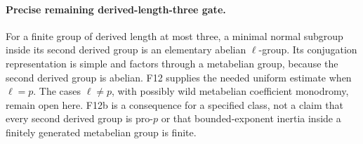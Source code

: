 \paragraph{Precise remaining derived-length-three gate.}
For a finite group of derived length at most three, a minimal
normal subgroup inside its second derived group is an elementary
abelian $\ell$-group. Its conjugation representation is simple
and factors through a metabelian group, because the second derived
group is abelian. F12 supplies the needed uniform estimate when
$\ell=p$. The cases $\ell\ne p$, with possibly wild metabelian
coefficient monodromy, remain open here. F12b is a consequence
for a specified class, not a claim that every second derived group
is pro-$p$ or that bounded-exponent inertia inside a finitely
generated metabelian group is finite.
